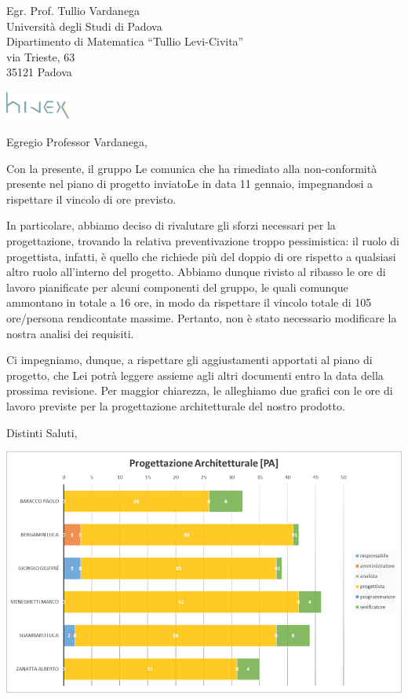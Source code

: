 \documentclass[a4paper]{letter} %
\date{Padova, \today}
\begin{document}
\begin{letter}{Egr. Prof. Tullio Vardanega\\
Università degli Studi di Padova\\
Dipartimento di Matematica “Tullio Levi-Civita”\\
via Trieste, 63\\
35121 Padova}

\includegraphics[width=80px]{../../util/hivex_logo3.png}

\opening{Egregio Professor Vardanega,}

Con la presente, il gruppo \hx{} Le comunica che ha rimediato alla non-conformità presente nel piano di progetto inviatoLe in data 11 gennaio, impegnandosi a rispettare il vincolo di ore previsto.

In particolare, abbiamo deciso di rivalutare gli sforzi necessari per la progettazione, trovando la relativa preventivazione troppo pessimistica: il ruolo di progettista, infatti, è quello che richiede più del doppio di ore rispetto a qualsiasi altro ruolo all'interno del progetto. Abbiamo dunque rivisto al ribasso le ore di lavoro pianificate per alcuni componenti del gruppo, le quali comunque ammontano in totale a 16 ore, in modo da rispettare il vincolo totale di 105 ore/persona rendicontate massime. Pertanto, non è stato necessario modificare la nostra analisi dei requisiti.

Ci impegniamo, dunque, a rispettare gli aggiustamenti apportati al piano di progetto, che Lei potrà leggere assieme agli altri documenti entro la data della prossima revisione. Per maggior chiarezza, le alleghiamo due grafici con le ore di lavoro previste per la progettazione architetturale del nostro prodotto.

\closing{Distinti Saluti,}

\end{letter}

\includegraphics[scale=0.5]{../Piano_di_progetto/img/orepa1.png}
\end{document}
